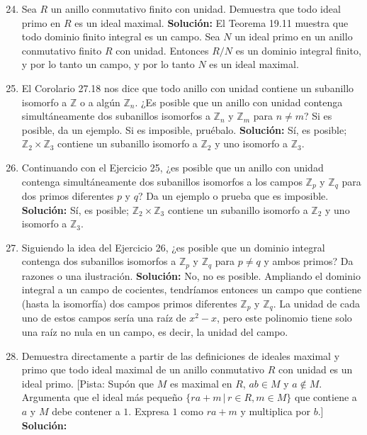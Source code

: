 \begin{enumerate}
    \setcounter{enumi}{23}
    \item Sea $R$ un anillo conmutativo finito con unidad. Demuestra que todo ideal primo en $R$ es un ideal maximal.
    \textbf{Solución:}
    El Teorema 19.11 muestra que todo dominio finito integral es un campo. Sea $N$ un ideal primo en un anillo conmutativo finito $R$ con unidad. Entonces $R/N$ es un dominio integral finito, y por lo tanto un campo, y por lo tanto $N$ es un ideal maximal.
    \item El Corolario 27.18 nos dice que todo anillo con unidad contiene un subanillo isomorfo a $\mathbb{Z}$ o a algún $\mathbb{Z}_n$. ¿Es posible que un anillo con unidad contenga simultáneamente dos subanillos isomorfos a $\mathbb{Z}_n$ y $\mathbb{Z}_m$ para $n \neq m$? Si es posible, da un ejemplo. Si es imposible, pruébalo.
    \textbf{Solución:}
    Sí, es posible; $\mathbb{Z}_2 \times \mathbb{Z}_3$ contiene un subanillo isomorfo a $\mathbb{Z}_2$ y uno isomorfo a $\mathbb{Z}_3$.
    \item Continuando con el Ejercicio 25, ¿es posible que un anillo con unidad contenga simultáneamente dos subanillos isomorfos a los campos $\mathbb{Z}_p$ y $\mathbb{Z}_q$ para dos primos diferentes $p$ y $q$? Da un ejemplo o prueba que es imposible.
    \textbf{Solución:}
     Sí, es posible; $\mathbb{Z}_2 \times \mathbb{Z}_3$ contiene un subanillo isomorfo a $\mathbb{Z}_2$ y uno isomorfo a $\mathbb{Z}_3$.
    \item Siguiendo la idea del Ejercicio 26, ¿es posible que un dominio integral contenga dos subanillos isomorfos a $\mathbb{Z}_p$ y $\mathbb{Z}_q$ para $p \neq q$ y ambos primos? Da razones o una ilustración.
    \textbf{Solución:}
    No, no es posible. Ampliando el dominio integral a un campo de cocientes, tendríamos entonces un campo que contiene (hasta la isomorfía) dos campos primos diferentes $\mathbb{Z}_p$ y $\mathbb{Z}_q$. La unidad de cada uno de estos campos sería una raíz de $x^2 - x$, pero este polinomio tiene solo una raíz no nula en un campo, es decir, la unidad del campo.
    \item Demuestra directamente a partir de las definiciones de ideales maximal y primo que todo ideal maximal de un anillo conmutativo $R$ con unidad es un ideal primo. [Pista: Supón que $M$ es maximal en $R$, $ab \in M$ y $a \notin M$. Argumenta que el ideal más pequeño $\{ra + m \,|\, r \in R, m \in M\}$ que contiene a $a$ y $M$ debe contener a $1$. Expresa $1$ como $ra + m$ y multiplica por $b$.]
    \textbf{Solución:}

\end{enumerate}
